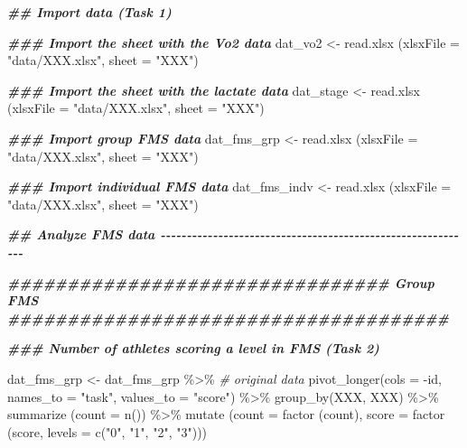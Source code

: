 \documentclass[
]{book}
\newenvironment{Shaded}{\begin{snugshade}}{\end{snugshade}}
\newcommand{\AttributeTok}[1]{\textcolor[rgb]{0.77,0.63,0.00}{#1}}
\newcommand{\CommentTok}[1]{\textcolor[rgb]{0.56,0.35,0.01}{\textit{#1}}}
\newcommand{\DocumentationTok}[1]{\textcolor[rgb]{0.56,0.35,0.01}{\textbf{\textit{#1}}}}
\newcommand{\FunctionTok}[1]{\textcolor[rgb]{0.00,0.00,0.00}{#1}}
\newcommand{\NormalTok}[1]{#1}
\newcommand{\OtherTok}[1]{\textcolor[rgb]{0.56,0.35,0.01}{#1}}
\newcommand{\SpecialCharTok}[1]{\textcolor[rgb]{0.00,0.00,0.00}{#1}}
\newcommand{\StringTok}[1]{\textcolor[rgb]{0.31,0.60,0.02}{#1}}
\begin{document}
\begin{Shaded}
\begin{Highlighting}[]
\DocumentationTok{\#\# Import data (Task 1)}

\DocumentationTok{\#\#\# Import the sheet with the Vo2 data}
\NormalTok{dat\_vo2 }\OtherTok{\textless{}{-}}  \FunctionTok{read.xlsx}\NormalTok{ (}\AttributeTok{xlsxFile =} \StringTok{"data/XXX.xlsx"}\NormalTok{,}
                       \AttributeTok{sheet =} \StringTok{"XXX"}\NormalTok{)}

\DocumentationTok{\#\#\# Import the sheet with the lactate data}
\NormalTok{dat\_stage }\OtherTok{\textless{}{-}}  \FunctionTok{read.xlsx}\NormalTok{ (}\AttributeTok{xlsxFile =} \StringTok{"data/XXX.xlsx"}\NormalTok{,}
                       \AttributeTok{sheet =} \StringTok{"XXX"}\NormalTok{)}

\DocumentationTok{\#\#\# Import group FMS data}
\NormalTok{dat\_fms\_grp }\OtherTok{\textless{}{-}}  \FunctionTok{read.xlsx}\NormalTok{ (}\AttributeTok{xlsxFile =} \StringTok{"data/XXX.xlsx"}\NormalTok{,}
                       \AttributeTok{sheet =} \StringTok{"XXX"}\NormalTok{)}

\DocumentationTok{\#\#\# Import individual FMS data}
\NormalTok{dat\_fms\_indv }\OtherTok{\textless{}{-}}  \FunctionTok{read.xlsx}\NormalTok{ (}\AttributeTok{xlsxFile =} \StringTok{"data/XXX.xlsx"}\NormalTok{,}
                       \AttributeTok{sheet =} \StringTok{"XXX"}\NormalTok{)}

\DocumentationTok{\#\# Analyze FMS data {-}{-}{-}{-}{-}{-}{-}{-}{-}{-}{-}{-}{-}{-}{-}{-}{-}{-}{-}{-}{-}{-}{-}{-}{-}{-}{-}{-}{-}{-}{-}{-}{-}{-}{-}{-}{-}{-}{-}{-}{-}{-}{-}{-}{-}{-}{-}{-}{-}{-}{-}{-}{-}{-}{-}{-}{-}{-}{-}{-}}

\DocumentationTok{\#\#\#\#\#\#\#\#\#\#\#\#\#\#\#\#\#\#\#\#\#\#\#\#\#\#\#\#\#\#\#\# Group FMS \#\#\#\#\#\#\#\#\#\#\#\#\#\#\#\#\#\#\#\#\#\#\#\#\#\#\#\#\#\#\#\#\#\#\#\#\#}

\DocumentationTok{\#\#\# Number of athletes scoring a level in FMS (Task 2)}

\NormalTok{dat\_fms\_grp }\OtherTok{\textless{}{-}}\NormalTok{ dat\_fms\_grp }\SpecialCharTok{\%\textgreater{}\%} \CommentTok{\# original data}
  \FunctionTok{pivot\_longer}\NormalTok{(}\AttributeTok{cols =} \SpecialCharTok{{-}}\NormalTok{id,}
              \AttributeTok{names\_to =} \StringTok{"task"}\NormalTok{,}
              \AttributeTok{values\_to =} \StringTok{"score"}\NormalTok{) }\SpecialCharTok{\%\textgreater{}\%}
  \FunctionTok{group\_by}\NormalTok{(XXX, XXX) }\SpecialCharTok{\%\textgreater{}\%}
  \FunctionTok{summarize}\NormalTok{ (}\AttributeTok{count =} \FunctionTok{n}\NormalTok{()) }\SpecialCharTok{\%\textgreater{}\%}
  \FunctionTok{mutate}\NormalTok{ (}\AttributeTok{count =} \FunctionTok{factor}\NormalTok{ (count),}
          \AttributeTok{score =} \FunctionTok{factor}\NormalTok{ (score, }\AttributeTok{levels =} \FunctionTok{c}\NormalTok{(}\StringTok{"0"}\NormalTok{, }\StringTok{"1"}\NormalTok{, }\StringTok{"2"}\NormalTok{, }\StringTok{"3"}\NormalTok{)))}


\end{Highlighting}
\end{Shaded}
\end{document}
